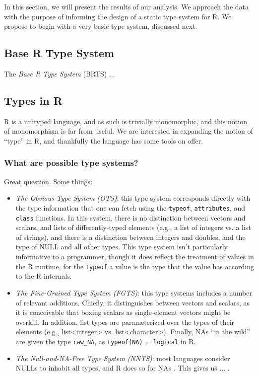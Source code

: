 \documentclass[acmsmall,10pt,review,anonymous]{acmart}\settopmatter{printfolios=true,printccs=false,printacmref=false}
\begin{document}
In this section, we will present the results of our analysis. 
We approach the data with the purpose of informing the design of a static type system for R.
We propose to begin with a very basic type system, discussed next.

\subsection{Base R Type System}

The {\it Base R Type System} (BRTS) ...

%
%
%
%
\subsection{Types in R}


R is a unityped language, and as such is trivially monomorphic, and this notion of monomorphism is far from useful.
We are interested in expanding the notion of ``type'' in R, and thankfully the language has some tools on offer.

%
%
\subsubsection{What are possible type systems?}

Great question.
Some things:

\begin{itemize}

\item {\it The Obvious Type System (OTS)}: this type system corresponds directly with the type information that one can fetch using the {\tt typeof}, {\tt attributes}, and {\tt class} functions.
In this system, there is no distinction between vectors and scalars, and lists of differently-typed elements (e.g., a list of integers vs. a list of strings), and there is a distinction between integers and doubles, and the type of NULL and all other types.
This type system isn't particularly informative to a programmer, though it does reflect the treatment of values in the R runtime, for the {\tt typeof} a value is the type that the value has according to the R internals.

\item {\it The Fine-Grained Type System (FGTS)}: this type systems includes a number of relevant additions.
Chiefly, it distinguishes between vectors and scalars, as it is conceivable that boxing scalars as single-element vectors might be overkill.
In addition, list types are parameterized over the types of their elements (e.g., list<integer> vs. list<character>).
Finally, NAs ``in the wild'' are given the type {\tt raw\_NA}, as {\tt typeof(NA) = logical} in R.

\item {\it The Null-and-NA-Free Type System (NNTS)}: most languages consider NULLs to inhabit all types, and R does so for NAs .
This gives us ... .

\end{itemize}
\end{document}
